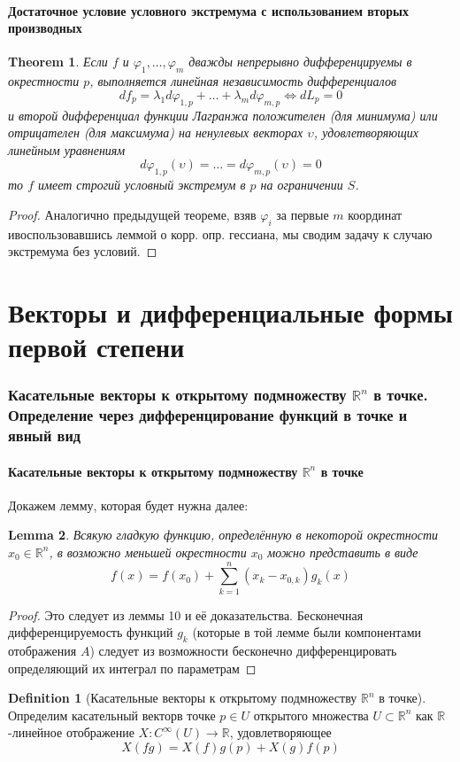 \documentclass[a4paper,12pt]{article} %
\newtheorem{theorem}{Theorem}
\newtheorem{lemma}[theorem]{Lemma}
\theoremstyle{definition}
\newtheorem{definition}{Definition}[section]
\begin{document}
\subsection{Достаточное условие условного экстремума с использованием вторых производных}
\begin{theorem}
	Если $f$ и $\varphi_1,\dots,\varphi_m$ дважды непрерывно дифференцируемы в окрестности $p$, выполняется линейная независимость дифференциалов
	$$d f_p = \lambda_1 d \varphi_{1, p} + \dots + \lambda_m d \varphi_{m, p}  \Leftrightarrow d L_p = 0$$
	и второй дифференциал функции Лагранжа положителен (для минимума) или отрицателен (для максимума) на ненулевых векторах $\upsilon$, удовлетворяющих линейным уравнениям
	$$d \varphi_{1, p}(\upsilon) = \dots = d \varphi_{m, p} (\upsilon) = 0$$
	то $f$ имеет строгий условный экстремум в $p$ на ограничении $S$.
\end{theorem}
\begin{proof}
	Аналогично предыдущей теореме, взяв $\varphi_i$ за первые $m$ координат ивоспользовавшись леммой о корр. опр. гессиана, мы сводим задачу к случаю экстремума без условий.
\end{proof}
\part{Векторы и дифференциальные формы первой степени}
\section{Касательные векторы к открытому подмножеству $\mathbb{R}^n$ в точке. Определение через дифференцирование функций в точке и явный вид}
\subsection{Касательные векторы к открытому подмножеству $\mathbb{R}^n$ в точке}
Докажем лемму, которая будет нужна далее:
\begin{lemma}
	Всякую гладкую функцию, определённую в некоторой окрестности $x_0 \in \mathbb{R}^n$, в возможно меньшей окрестности $x_0$ можно представить в виде
	\begin{equation}
		f(x) = f(x_0) + \sum_{k = 1}^n (x_k - x_{0,k})g_k(x)
	\end{equation}
\end{lemma}
\begin{proof}
	Это следует из леммы 10 и её доказательства. Бесконечная дифференцируемость функций $g_k$ (которые в той лемме были компонентами отображения $A$) следует из возможности бесконечно дифференцировать определяющий их интеграл по параметрам
\end{proof}
\begin{definition}[Касательные векторы к открытому подмножеству $\mathbb{R}^n$ в точке]
	Определим касательный векторв точке $p \in U$ открытого множества $U\subset \mathbb{R}^n$ как $\mathbb{R}$-линейное отображение $X : C^{\infty}(U) \rightarrow \mathbb{R}$, удовлетворяющее
	\begin{equation}
		X(fg) = X(f)g(p) + X(g)f(p)
	\end{equation}
\end{definition}
\end{document}
